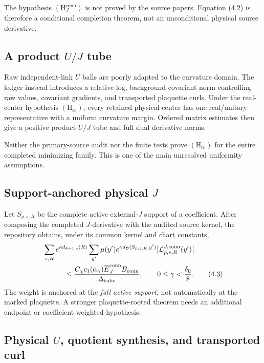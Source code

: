 \documentclass[11pt]{article}
\theoremstyle{definition}
\newcommand{\Hrc}{(\mathrm H_{\mathrm{rc}})}
\newcommand{\HJ}{(\mathrm H_J^{\mathrm{conn}})}
\begin{document}
The hypothesis \(\HJ\) is not proved by the source papers.  Equation (4.2)
is therefore a conditional completion theorem, not an unconditional
physical source derivative.

\subsection{A product \(U/J\) tube}

Raw independent-link \(U\) balls are poorly adapted to the curvature domain.
The ledger instead introduces a relative-log, background-covariant norm
controlling raw values, covariant gradients, and transported plaquette
curls.  Under the real-center hypothesis \(\Hrc\), every retained physical
center has one real/unitary representative with a uniform curvature margin.
Ordered matrix estimates then give a positive product \(U/J\) tube and full
dual derivative norms.

Neither the primary-source audit nor the finite tests prove \(\Hrc\) for
the entire completed minimizing family.  This is one of the main unresolved
uniformity assumptions.

\subsection{Support-anchored physical \(J\)}

Let \(S_{p,s,R}\) be the complete active external-\(J\) support of a
coefficient.  After composing the completed \(J\)-derivative with the
audited source kernel, the repository obtains, under its common kernel and
chart constants,
\begin{align}
&\sum_{s,R} e^{\kappa d_{k+1,s}(R)}
\sum_{y'}\mu(y')
e^{\gamma d_{\mathcal B}(S_{p,s,R},y')}
\bigl|\mathcal L^{J,\mathrm{conn}}_{p,s,R}(y')\bigr|
\notag\\
&\hspace{3em}\le
\frac{
  C_\chi c_1(\alpha_\gamma)
  \overline E_J^{\mathrm{conn}}B_{\mathrm{conn}}
}{
  \Delta_{\mathrm{tube}}
},
\qquad
0\le\gamma<\frac{\delta_0}{8}.
\tag{4.3}
\end{align}
The weight is anchored at the \emph{full active support}, not automatically
at the marked plaquette.  A stronger plaquette-rooted theorem needs an
additional endpoint or coefficient-weighted hypothesis.

\subsection{Physical \(U\), quotient synthesis, and transported curl}
\end{document}
